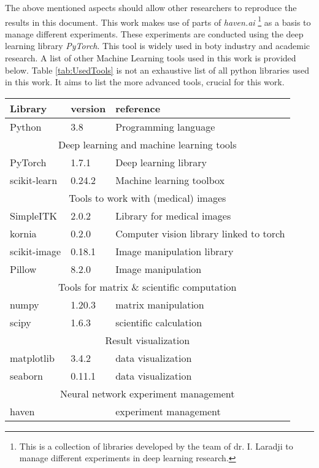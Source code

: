 The above mentioned aspects should allow other researchers to reproduce the results in this document.
This work makes use of parts of \textit{haven.ai} \footnote{This is a collection of libraries developed by the team of dr. I. Laradji to manage different experiments in deep learning research.} 
as a basis to manage different experiments.
These experiments are conducted using the deep learning library \textit{PyTorch}.
This tool is widely used in boty industry and academic research.
A list of other Machine Learning tools used in this work is provided below.
Table \ref{tab:UsedTools} is not an exhaustive list of all  python libraries used in this work.
It aims to list the more advanced tools, crucial for this work.

\begin{SCtable}[\sidecaptionrelwidth][h]
 
  \begin{tabular}{ p{2cm} l l } 
   \hline
   \hline
   \textbf{Library} & \textbf{version} & \textbf{reference}    \\
   \hline 
  Python & 3.8 & Programming language \\
   \hline
   \multicolumn{3}{c}{Deep learning and machine learning tools} \\
   \hline
   PyTorch & 1.7.1 & Deep learning library \\ 
   scikit-learn & 0.24.2 & Machine learning toolbox \\
   \hline
   \multicolumn{3}{c}{Tools to work with (medical) images} \\
   \hline
   SimpleITK & 2.0.2 & Library for medical images \\ 
   kornia & 0.2.0 & Computer vision library linked to torch \\
   scikit-image & 0.18.1 & Image manipulation library \\
   Pillow & 8.2.0 & Image manipulation\\
   \hline
   \multicolumn{3}{c}{Tools for matrix \& scientific computation} \\
   \hline
   numpy & 1.20.3 & matrix manipulation \\
   scipy & 1.6.3 & scientific calculation \\
   \hline
   \multicolumn{3}{c}{Result visualization} \\
   \hline
   matplotlib & 3.4.2 & data visualization \\ 
   seaborn & 0.11.1 & data visualization \\
   \multicolumn{3}{c}{Neural network experiment management} \\
   \hline
   haven &  & experiment management \\ 
   \hline
   \hline
  \end{tabular}
  \caption{Python libraries used. \label{tab:UsedTools}}

\end{SCtable}

